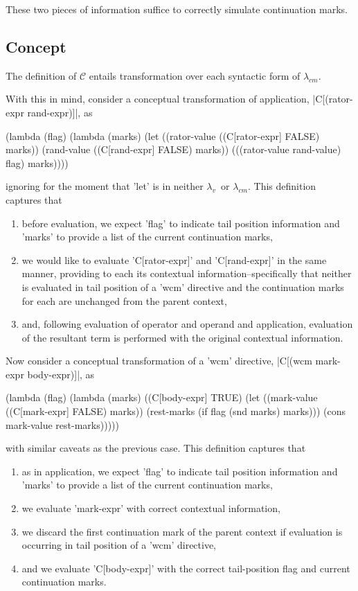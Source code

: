 \documentclass[ms,electronic,twosidetoc,letterpaper,chaptercenter,parttop]{byumsphd}
\newcommand{\lv}{$\lambda_v$}
\newcommand{\cm}{$\lambda_{cm}$}
\begin{document}
These two pieces of information suffice to correctly simulate continuation marks.

\subsection{Concept}

The definition of $\mathcal{C}$ entails transformation over each syntactic form of \cm.

With this in mind, consider a conceptual transformation of application, \scheme|C[(rator-expr rand-expr)]|, as
\begin{schemedisplay}
(lambda (flag)
  (lambda (marks)
    (let ((rator-value ((C[rator-expr] FALSE) marks))
          (rand-value ((C[rand-expr] FALSE) marks))
      (((rator-value rand-value) flag) marks))))
\end{schemedisplay}
ignoring for the moment that \scheme'let' is in neither \lv\ or \cm. This definition captures that
\begin{enumerate}
\item before evaluation, we expect \scheme'flag' to indicate tail position information and \scheme'marks' to provide a list of the current continuation marks,
\item we would like to evaluate \scheme'C[rator-expr]' and \scheme'C[rand-expr]' in the same manner, providing to each its contextual information--specifically that neither is evaluated in tail position of a \scheme'wcm' directive and the continuation marks for each are unchanged from the parent context,
\item and, following evaluation of operator and operand and application, evaluation of the resultant term is performed with the original contextual information.
\end{enumerate}

Now consider a conceptual transformation of a \scheme'wcm' directive, \scheme|C[(wcm mark-expr body-expr)]|, as
\begin{schemedisplay}
(lambda (flag)
  (lambda (marks)
    ((C[body-expr] TRUE) (let ((mark-value ((C[mark-expr] FALSE) marks))
                               (rest-marks (if flag (snd marks) marks)))
                           (cons mark-value rest-marks)))))
\end{schemedisplay}
with similar caveats as the previous case. This definition captures that
\begin{enumerate}
\item as in application, we expect \scheme'flag' to indicate tail position information and \scheme'marks' to provide a list of the current continuation marks,
\item we evaluate \scheme'mark-expr' with correct contextual information,
\item we discard the first continuation mark of the parent context if evaluation is occurring in tail position of a \scheme'wcm' directive,
\item and we evaluate \scheme'C[body-expr]' with the correct tail-position flag and current continuation marks.
\end{enumerate}
\end{document}
